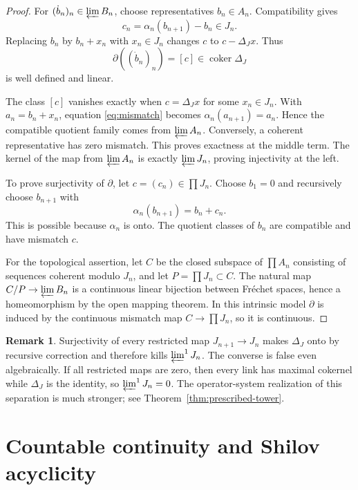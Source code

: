 \documentclass[11pt,a4paper]{amsart}
\theoremstyle{plain}
\theoremstyle{definition}
\newtheorem{remark}[theorem]{Remark}
\newcommand{\coker}{\operatorname{coker}}
\begin{document}
\begin{proof}
For $(\dot b_n)_n\in\varprojlim B_n$, choose representatives $b_n\in A_n$.  Compatibility gives
\begin{equation}\label{eq:mismatch}
 c_n=\alpha_n(b_{n+1})-b_n\in J_n.
\end{equation}
Replacing $b_n$ by $b_n+x_n$ with $x_n\in J_n$ changes $c$ to
$c-\Delta_Jx$.  Thus
\[
 \partial((\dot b_n)_n)=[c]\in\coker\Delta_J
\]
is well defined and linear.

The class $[c]$ vanishes exactly when $c=\Delta_Jx$ for some $x_n\in J_n$.  With
$a_n=b_n+x_n$, equation \eqref{eq:mismatch} becomes
$\alpha_n(a_{n+1})=a_n$.  Hence the compatible quotient family comes from
$\varprojlim A_n$.  Conversely, a coherent representative has zero mismatch.  This proves
exactness at the middle term.  The kernel of the map from $\varprojlim A_n$ is exactly
$\varprojlim J_n$, proving injectivity at the left.

To prove surjectivity of $\partial$, let $c=(c_n)\in\prod J_n$.  Choose $b_1=0$ and recursively
choose $b_{n+1}$ with
\[
 \alpha_n(b_{n+1})=b_n+c_n.
\]
This is possible because $\alpha_n$ is onto.  The quotient classes of $b_n$ are compatible and
have mismatch $c$.

For the topological assertion, let $C$ be the closed subspace of $\prod A_n$ consisting of
sequences coherent modulo $J_n$, and let $P=\prod J_n\subset C$.  The natural map
$C/P\to\varprojlim B_n$ is a continuous linear bijection between Fr\'echet spaces, hence a
homeomorphism by the open mapping theorem.  In this intrinsic model $\partial$ is induced by the
continuous mismatch map $C\to\prod J_n$, so it is continuous.
\end{proof}

\begin{remark}\label{rem:pointwise-not-global}
Surjectivity of every restricted map $J_{n+1}\to J_n$ makes $\Delta_J$ onto by recursive
correction and therefore kills $\varprojlim^1J_n$.  The converse is false even algebraically.  If
all restricted maps are zero, then every link has maximal cokernel while $\Delta_J$ is the
identity, so $\varprojlim^1J_n=0$.  The operator-system realization of this separation is much
stronger; see Theorem~\ref{thm:prescribed-tower}.
\end{remark}

\section{Countable continuity and Shilov acyclicity}\label{sec:continuity}
\end{document}
